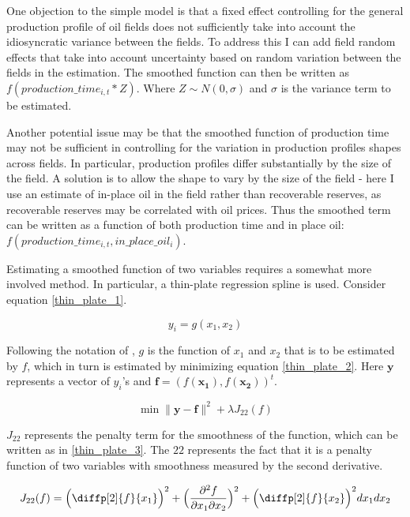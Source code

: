 \documentclass[12pt]{article}
\begin{document}
One objection to the simple model is that a fixed effect controlling for the general production profile of oil fields does not sufficiently take into account the idiosyncratic variance between the fields. To address this I can add field random effects that take into account uncertainty based on random variation between the fields in the estimation. The smoothed function can then be written as $f(production\_time_{i,t}*Z)$.  Where $Z \sim N(0, \sigma)$ and $\sigma$ is the variance term to be estimated.  

Another potential issue may be that the smoothed function of production time may not be sufficient in controlling for the variation in production profiles shapes across fields.  In particular, production profiles differ substantially by the size of the field. A solution is to allow the shape to vary by the size of the field - here I use an estimate of in-place oil in the field rather than recoverable reserves, as recoverable reserves may be correlated with oil prices.  Thus the smoothed term can be written as a function of both production time and in place oil: $f(production\_time_{i,t}, in\_place\_oil_{i})$.

Estimating a smoothed function of two variables requires a somewhat more involved method.  In particular, a thin-plate regression spline \citep{wood_thin_2003} is used. Consider equation \ref{thin_plate_1}. 

	\begin{equation}
	y_i = g(x_1, x_2)
	\label{thin_plate_1}
	\end{equation}

Following the notation of \citet{wood_generalized_2006}, $g$ is the function of $x_1$ and $x_2$ that is to be estimated by $f$, which in turn is estimated by minimizing equation \ref{thin_plate_2}.  Here $\boldsymbol{y}$ represents a vector of $y_i$'s and $\boldsymbol{f} = (f(\boldsymbol{x_1}),f(\boldsymbol{x_2}))^t$.   

	\begin{equation}
\min \|\boldsymbol{y-f}\|^2 + \lambda J_{22}(f)
\label{thin_plate_2}
	\end{equation}

$J_{22}$ represents the penalty term for the smoothness of the function, which can be written as in \ref{thin_plate_3}.  The $22$ represents the fact that it is a penalty function of two variables with smoothness measured by the second derivative.

	\begin{equation}
	J_{22}(f)= \Big(  \diffp[2]{f}{x_1} \Big)^2 +
	 \Big(\frac{\partial^2 f}{\partial x_1 \partial x_2}\Big)^2 + 
	\Big(\diffp[2]{f}{x_2} \Big)^2dx_1 dx_2
\label{thin_plate_3}
	\end{equation}
\end{document}

